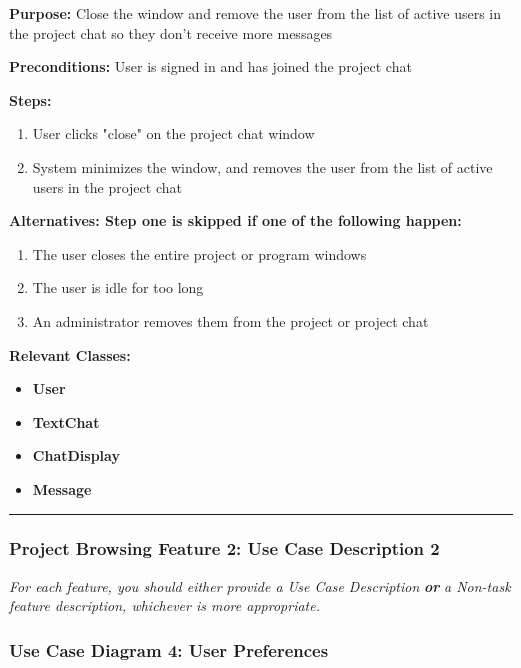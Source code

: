 \documentclass[twoside,letterpaper]{article}
\begin{document}
\noindent\textbf{Purpose:} Close the window and remove the user from the list of active users in the project chat so they don't receive more messages \newline

\noindent\textbf{Preconditions:} User is signed in and has joined the project chat \newline

\noindent\textbf{Steps:} \begin{enumerate}
	\item User clicks "close" on the project chat window
	\item System minimizes the window, and removes the user from the list of active users in the project chat
\end{enumerate}
\noindent\textbf{Alternatives: Step one is skipped if one of the following happen: }
\begin{enumerate}
	\item The user closes the entire project or program windows
	\item The user is idle for too long
	\item An administrator removes them from the project or project chat
\end{enumerate}


\noindent\textbf{Relevant Classes:}
\begin{itemize}
	\item \textbf{User}
	\item \textbf{TextChat}
	\item \textbf{ChatDisplay}
	\item \textbf{Message}
\end{itemize}
\hrule
\newpage


\subsubsection[Project Browsing Feature 2: Use Case Description 2]{\rmfamily\bfseries\color{black}
	Project Browsing Feature 2: Use Case Description 2}
\hypertarget{RefHeading22059017292}{}
\bigskip

{\color{black}
	\foreignlanguage{english}{\textit{For each feature, you should either provide a Use Case Description
		}}\foreignlanguage{english}{\textbf{\textit{or}}}\foreignlanguage{english}{\textit{ a Non-task feature description,
		whichever is more appropriate.}}}
\newpage

\subsubsection[Use Case Diagram 4: User Preferences]{\rmfamily\bfseries\color{black}
	Use Case Diagram 4: User Preferences}
\end{document}
